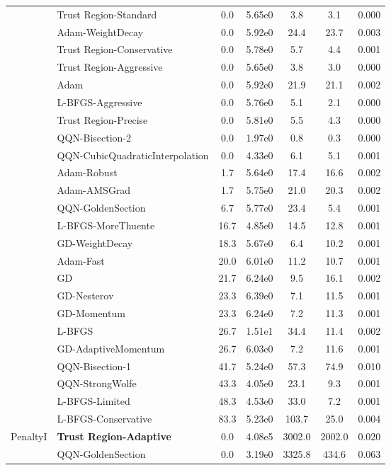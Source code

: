\documentclass{article}
\begin{document}
\begin{table}[htbp]
{\begin{tabular}{p{2.5cm}p{2.5cm}*{5}{c}}
 & Trust Region-Standard & 0.0 & 5.65e0 & 3.8 & 3.1 & 0.000 \\
 & Adam-WeightDecay & 0.0 & 5.92e0 & 24.4 & 23.7 & 0.003 \\
 & Trust Region-Conservative & 0.0 & 5.78e0 & 5.7 & 4.4 & 0.001 \\
 & Trust Region-Aggressive & 0.0 & 5.65e0 & 3.8 & 3.0 & 0.000 \\
 & Adam & 0.0 & 5.92e0 & 21.9 & 21.1 & 0.002 \\
 & L-BFGS-Aggressive & 0.0 & 5.76e0 & 5.1 & 2.1 & 0.000 \\
 & Trust Region-Precise & 0.0 & 5.81e0 & 5.5 & 4.3 & 0.000 \\
 & QQN-Bisection-2 & 0.0 & 1.97e0 & 0.8 & 0.3 & 0.000 \\
 & QQN-CubicQuadraticInterpolation & 0.0 & 4.33e0 & 6.1 & 5.1 & 0.001 \\
 & Adam-Robust & 1.7 & 5.64e0 & 17.4 & 16.6 & 0.002 \\
 & Adam-AMSGrad & 1.7 & 5.75e0 & 21.0 & 20.3 & 0.002 \\
 & QQN-GoldenSection & 6.7 & 5.77e0 & 23.4 & 5.4 & 0.001 \\
 & L-BFGS-MoreThuente & 16.7 & 4.85e0 & 14.5 & 12.8 & 0.001 \\
 & GD-WeightDecay & 18.3 & 5.67e0 & 6.4 & 10.2 & 0.001 \\
 & Adam-Fast & 20.0 & 6.01e0 & 11.2 & 10.7 & 0.001 \\
 & GD & 21.7 & 6.24e0 & 9.5 & 16.1 & 0.002 \\
 & GD-Nesterov & 23.3 & 6.39e0 & 7.1 & 11.5 & 0.001 \\
 & GD-Momentum & 23.3 & 6.24e0 & 7.2 & 11.3 & 0.001 \\
 & L-BFGS & 26.7 & 1.51e1 & 34.4 & 11.4 & 0.002 \\
 & GD-AdaptiveMomentum & 26.7 & 6.03e0 & 7.2 & 11.6 & 0.001 \\
 & QQN-Bisection-1 & 41.7 & 5.24e0 & 57.3 & 74.9 & 0.010 \\
 & QQN-StrongWolfe & 43.3 & 4.05e0 & 23.1 & 9.3 & 0.001 \\
 & L-BFGS-Limited & 48.3 & 4.53e0 & 33.0 & 7.2 & 0.001 \\
 & L-BFGS-Conservative & 83.3 & 5.23e0 & 103.7 & 25.0 & 0.004 \\
\midrule
\multirow{25}{*}{PenaltyI} & \textbf{Trust Region-Adaptive} & 0.0 & 4.08e5 & 3002.0 & 2002.0 & 0.020 \\
 & QQN-GoldenSection & 0.0 & 3.19e0 & 3325.8 & 434.6 & 0.063 \\

\end{tabular}}
\end{table}
\end{document}
